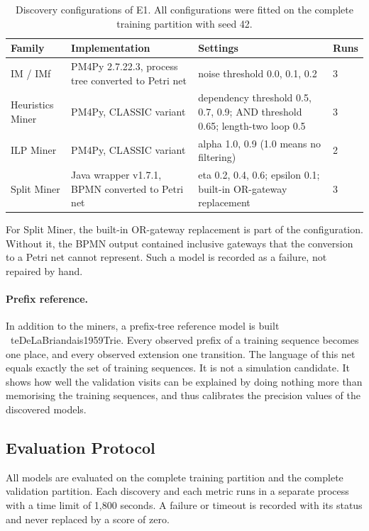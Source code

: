 \begin{table}[htbp]
\centering
\begin{tabularx}{\textwidth}{L{2.6cm}L{4.4cm}YL{1.0cm}}
\toprule
\textbf{Family} & \textbf{Implementation} & \textbf{Settings} & \textbf{Runs} \\
\midrule
IM / IMf & PM4Py 2.7.22.3, process tree converted to Petri net & noise threshold 0.0, 0.1, 0.2 & 3 \\
Heuristics Miner & PM4Py, CLASSIC variant & dependency threshold 0.5, 0.7, 0.9; AND threshold 0.65; length-two loop 0.5 & 3 \\
ILP Miner & PM4Py, CLASSIC variant & alpha 1.0, 0.9 (1.0 means no filtering) & 2 \\
Split Miner & Java wrapper v1.7.1, BPMN converted to Petri net & eta 0.2, 0.4, 0.6; epsilon 0.1; built-in OR-gateway replacement & 3 \\
\bottomrule
\end{tabularx}
\caption{Discovery configurations of E1. All configurations were fitted
on the complete training partition with seed 42.}
\label{tab:exp_grid}
\end{table}

For Split Miner, the built-in OR-gateway replacement is part of the
configuration. Without it, the BPMN output contained inclusive gateways
that the conversion to a Petri net cannot represent. Such a model is
recorded as a failure, not repaired by hand.

\paragraph{Prefix reference.}
In addition to the miners, a prefix-tree reference model is built
\	te{DeLaBriandais1959Trie}. Every observed prefix of a training
sequence becomes one place, and every observed extension one transition.
The language of this net equals exactly the set of training sequences.
It is not a simulation candidate. It shows how well the validation
visits can be explained by doing nothing more than memorising the
training sequences, and thus calibrates the precision values of the
discovered models.

\subsection{Evaluation Protocol}
\label{sec:exp_discovery_eval}

All models are evaluated on the complete training partition and the
complete validation partition. Each discovery and each metric runs in a
separate process with a time limit of 1,800 seconds. A failure or
timeout is recorded with its status and never replaced by a score of
zero.

